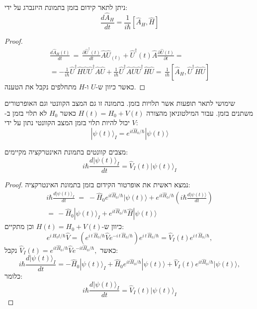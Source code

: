 \documentclass{tstextbook}
\begin{document}
\begin{proposition}
ניתן לתאר קידום בזמן בתמונת היזנברג על ידי:
$$\frac{d\hat{A}_{H}}{d t}=\frac{1}{i\hbar}\left[\hat{A}_{H},\hat{H}\right]$$

\end{proposition}
\begin{proof}
$$\begin{gather}\frac{d\hat{A}_{H}(t)}{d t}\,=\,\frac{\partial\hat{U}^{\dagger}(t)}{d t}\hat{A}\hat{U}_{(t)}+\hat{U}^{\dagger}(t)\hat{A}\frac{\partial\hat{U}(t)}{\partial t}=\\=-\frac{1}{i\hbar}\hat{U}^{\dagger}\hat{H}\hat{U}\hat{U}^{\dagger}\hat{A}\hat{U}+\frac{1}{i\hbar}\hat{U}^{\dagger}\hat{A}\hat{U}\hat{U}^{\dagger}\hat{H}\hat{U}=\,\frac{1}{i\hbar}\left[\hat{A}_{H},\hat{U}^{\dagger}\hat{H}\hat{U}\right] 
\end{gather}$$
כאשר כיוון ש-\(U\) ו-\(H\) מתחלפים נקבל את הטענה.

\end{proof}
\begin{definition}
שימושי לתאר תופעות אשר תלויות בזמן. בתמונה זו גם המצב הקוונטי וגם האופרטורים משתנים בזמן. עבור המילטוניאן מהצורה \(H(t)=H_{0}+V(t)\) כאשר \(H_{0}\) לא תלוי בזמן ב-\(V\) יכול להיות תלוי בזמן המצב הקוונטי נתון על ידי:
$$|\psi(t)\rangle_{I}=e^{i t\hat{H}_{0}/\hbar}|\psi(t)\rangle$$

\end{definition}
\begin{proposition}
מצבים קוונטים בתמונת האינטרקציה מקיימים:
$$i\hbar\frac{d|\psi(t)\rangle_{I}}{d t}=\hat{V}_{I}(t)|\psi(t)\rangle_{I}$$

\end{proposition}
\begin{proof}
נמצא ראשית את אופרטור הקידום בזמן בתמונת האינטרקציה:
$$\begin{gather}i\hbar\frac{d|\psi(t)\rangle_{I}}{d t}\;=\;-\hat{H}_{0}e^{i t\hat{H}_{0}/\hbar}|\psi(t)\rangle+e^{i t\hat{H}_{0}/\hbar}\left(i\hbar\frac{d|\psi(t)\rangle}{d t}\right)\\=\,-\hat{H}_{0}|\psi(t)\rangle_{I}+e^{i t\hat{H}_{0}/\hbar}\hat{H}|\psi(t)\rangle 
\end{gather}$$
כיוון ש-\(H(t)=H_{0}+V(t)\) וכן מתקיים:
$$e^{i\,H_{0}t/\hbar}\hat{V}=\left(e^{i\,t\,\hat{H}_{0}/\hbar}\hat{V}e^{-i\,t\,\hat{H}_{0}/\hbar}\right)e^{i\,t\,\hat{H}_{0}/\hbar}=\hat{V}_{I}(t)e^{i\,t\,\hat{H}_{0}/\hbar},$$
כאשר \(\hat{V}_{I}(t)=e^{i t\hat{H}_{0}/\hbar}\hat{V}e^{-i t\hat{H}_{0}/\hbar},\) נקבל:
$$i\hbar\frac{d|\psi(t)\rangle_{I}}{d t}=-\hat{H}_{0}|\psi(t)\rangle_{I}+\hat{H}_{0}e^{i t\hat{H}_{0}/\hbar}|\psi(t)\rangle+\hat{V}_{I}(t)e^{i t\hat{H}_{0}/\hbar}|\psi(t)\rangle,$$
כלומר:
$$i\hbar\frac{d|\psi(t)\rangle_{I}}{d t}=\hat{V}_{I}(t)|\psi(t)\rangle_{I}$$

\end{proof}
\end{document}
